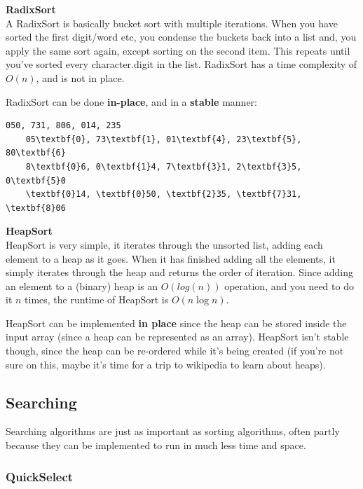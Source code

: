 \begin{description}
\item \textbf{RadixSort}\\
  A RadixSort is basically bucket sort with multiple iterations. When you have
  sorted the first digit/word etc, you condense the buckets back into a list
  and, you apply the same sort again, except sorting on the second item.
  This repeats until you've sorted every character.digit in the list. RadixSort
  has a time complexity of $O(n)$, and is not in place.

  RadixSort can be done \textbf{in-place}, and in a \textbf{stable} manner:
  \begin{Verbatim}[commandchars=\\\{\},codes={\catcode`$=3\catcode`_=8}]
    050, 731, 806, 014, 235
    05\textbf{0}, 73\textbf{1}, 01\textbf{4}, 23\textbf{5}, 80\textbf{6}
    8\textbf{0}6, 0\textbf{1}4, 7\textbf{3}1, 2\textbf{3}5, 0\textbf{5}0
    \textbf{0}14, \textbf{0}50, \textbf{2}35, \textbf{7}31, \textbf{8}06
  \end{Verbatim}

\item \textbf{HeapSort} \\
  HeapSort is very simple, it iterates through the unsorted list, adding each
  element to a heap as it goes. When it has finished adding all the elements, it
  simply iterates through the heap and returns the order of iteration. Since
  adding an element to a (binary) heap is an $O(log(n))$ operation, and you need
  to do it $n$ times, the runtime of HeapSort is $O(n\log{n})$.

  HeapSort can be implemented \textbf{in place} since the heap can be stored
  inside the input array (since a heap can be represented as an array). HeapSort
  isn't stable though, since the heap can be re-ordered while it's being created
  (if you're not sure on this, maybe it's time for a trip to wikipedia to learn
  about heaps).

\end{description}

\subsection{Searching}

Searching algorithms are just as important as sorting algorithms, often partly
because they can be implemented to run in much less time and space.

\subsubsection{QuickSelect}
\label{QuickSelect}

